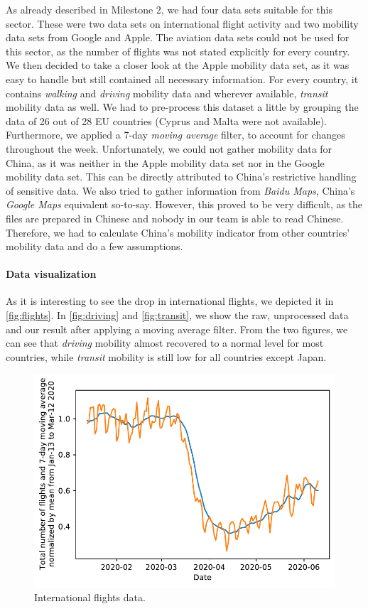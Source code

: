 As already described in Milestone 2, we had four data sets suitable for this sector. These were two data sets on international flight activity and two mobility data sets from Google and Apple. The aviation data sets could not be used for this sector, as the number of flights was not stated explicitly for every country. We then decided to take a closer look at the Apple mobility data set, as it was easy to handle but still contained all necessary information. For every country, it contains \textit{walking} and \textit{driving} mobility data and wherever available, \textit{transit} mobility data as well. We had to pre-process this dataset a little by grouping the data of 26 out of 28 EU countries (Cyprus and Malta were not available). Furthermore, we applied a 7-day \textit{moving average} filter, to account for changes throughout the week. Unfortunately, we could not gather mobility data for China, as it was neither in the Apple mobility data set nor in the Google mobility data set. This can be directly attributed to China's restrictive handling of sensitive data. We also tried to gather information from \textit{Baidu Maps}, China's \textit{Google Maps} equivalent so-to-say. However, this proved to be very difficult, as the files are prepared in Chinese and nobody in our team is able to read Chinese. Therefore, we had to calculate China's mobility indicator from other countries' mobility data and do a few assumptions.

\paragraph{Data visualization}

As it is interesting to see the drop in international flights, we depicted it in \autoref{fig:flights}. In \autoref{fig:driving} and \ref{fig:transit}, we show the raw, unprocessed data and our result after applying a moving average filter. From the two figures, we can see that \textit{driving} mobility almost recovered to a normal level for most countries, while \textit{transit} mobility is still low for all countries except Japan.


\begin{figure}[hb!]
	\centering
	\includegraphics[width=0.7\linewidth]{../predictions/flights.pdf}
	\caption{International flights data.}
	\label{fig:flights}
\end{figure}



